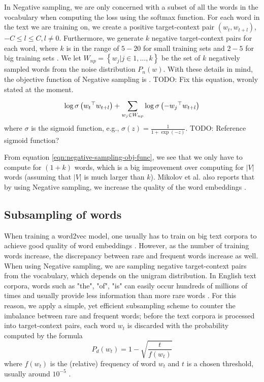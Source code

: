 \noindent
In Negative sampling, we are only concerned with a subset of all the words in the vocabulary when computing the loss using the softmax function. For each word in the text we are training on, we create a positive target-context pair $\left( w_t, w_{t+l} \right)$, $-C \leq l \leq C, l \neq 0$. Furthermore, we generate $k$ negative target-context pairs for each word, where $k$ is in the range of $5-20$ for small training sets and $2-5$ for big training sets \cite{mikolov2013b}. We let $W_{np} = \left \{ w_j | j \in 1, \ldots, k \right \}$ be the set of $k$ negatively sampled words from the noise distribution $P_n(w)$. With these details in mind, the objective function of Negative sampling is \cite{mikolov2013b, rong2014word2vec}. TODO: Fix this equation, wronly stated at the moment.
\begin{align}
\log \sigma \left( {w_t}^\top w_{t+l} \right) + \sum\limits_{w_j \in W_{np}}^{} \log \sigma \left( -{w_j}^\top w_{t+l} \right)
\label{eqn:negative-sampling-obj-func}
\end{align}
where $\sigma$ is the sigmoid function, e.g., $\sigma(z) = \frac{1}{1 + \exp{(-z)}}$. TODO: Reference sigmoid function?

\noindent
From equation \ref{eqn:negative-sampling-obj-func}, we see that we only have to compute for $(1 + k)$ words, which is a big improvement over computing for $|V|$ words (assuming that $|V|$ is much larger than $k$). Mikolov et al. also reports that by using Negative sampling, we increase the quality of the word embeddings \cite{mikolov2013b}.

\subsection{Subsampling of words}
When training a word2vec model, one usually has to train on big text corpora to achieve good quality of word embeddings \cite{mikolov2013a}. However, as the number of training words increase, the discrepancy between rare and frequent words increase as well. When using Negative sampling, we are sampling negative target-context pairs from the vocabulary, which depends on the unigram distribution. In English text corpora, words such as "the", "of", "is" can easily occur hundreds of millions of times and usually provide less information than more rare words \cite{mikolov2013b}. For this reason, we apply a simple, yet efficient subsampling scheme to counter the imbalance between rare and frequent words; before the text corpora is processed into target-context pairs, each word $w_t$ is discarded with the probability computed by the formula \cite{mikolov2013b, levy-etal-2015-improving}
\begin{equation}
    P_d(w_t) = 1 - \sqrt{\frac{t}{f(w_t)}}
\end{equation}
where $f(w_t)$ is the (relative) frequency of word $w_t$ and $t$ is a chosen threshold, usually around $10^{-5}$ \cite{mikolov2013b}.

